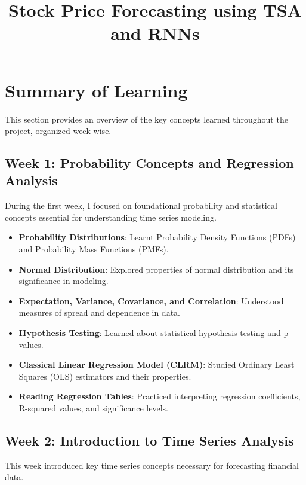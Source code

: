 \documentclass{article} %
\title{Stock Price Forecasting using TSA and RNNs}
\begin{document}
\maketitle

\section{Summary of Learning}

This section provides an overview of the key concepts learned throughout the project, organized week-wise.

\subsection{Week 1: Probability Concepts and Regression Analysis}

During the first week, I focused on foundational probability and statistical concepts essential for understanding time series modeling.

\begin{itemize}
    \item \textbf{Probability Distributions}: Learnt Probability Density Functions (PDFs) and Probability Mass Functions (PMFs).
    \item \textbf{Normal Distribution}: Explored properties of normal distribution and its significance in modeling.
    \item \textbf{Expectation, Variance, Covariance, and Correlation}: Understood measures of spread and dependence in data.
    \item \textbf{Hypothesis Testing}: Learned about statistical hypothesis testing and p-values.
    \item \textbf{Classical Linear Regression Model (CLRM)}: Studied Ordinary Least Squares (OLS) estimators and their properties.
    \item \textbf{Reading Regression Tables}: Practiced interpreting regression coefficients, R-squared values, and significance levels.
\end{itemize}

\subsection{Week 2: Introduction to Time Series Analysis}

This week introduced key time series concepts necessary for forecasting financial data.
\end{document}
